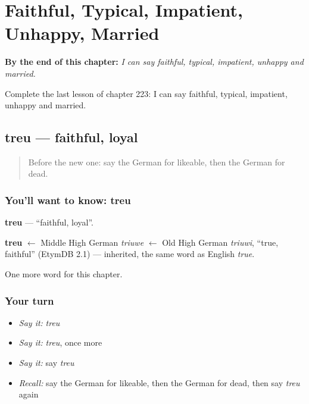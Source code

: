 
\chapter{Faithful, Typical, Impatient, Unhappy, Married}
\label{ch:ge-faithful-typical-impatient-unhappy-married}

\begin{chapteropening}
\textbf{By the end of this chapter:} \emph{I can say faithful, typical, impatient, unhappy and married.}

Complete the last lesson of chapter 223: I can say faithful, typical, impatient, unhappy and married.
\end{chapteropening}

\section[treu]{treu — faithful, loyal}

\label{lesson:GE-C223-treu}



\begin{quote}
Before the new one: say the German for likeable, then the German for dead.
\end{quote}

\subsection*{You'll want to know: treu}
\textbf{treu} — \textquotedblleft{}faithful, loyal\textquotedblright{}.

\begin{cousinweb}
\textbf{treu} $\leftarrow$ Middle High German \emph{triuwe} $\leftarrow$ Old High German \emph{triuwi}, \textquotedblleft{}true, faithful\textquotedblright{} (EtymDB 2.1) — inherited, the same word as English \emph{true}.
\end{cousinweb}

\begin{grammarlens}[title={What you've built}]
One more word for this chapter.
\end{grammarlens}

\subsection*{Your turn}
\begin{itemize}
\raggedright
  \item \emph{Say it:} \emph{treu}
  \item \emph{Say it:} \emph{treu}, once more
  \item \emph{Say it:} say \emph{treu}
  \item \emph{Recall:} say the German for likeable, then the German for dead, then say \emph{treu} again
\end{itemize}

